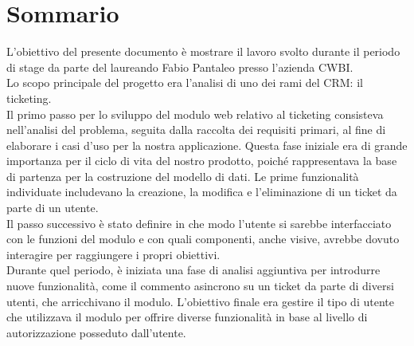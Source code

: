 \cleardoublepage
{}
{}
\begingroup
\let\clearpage\relax
\let\cleardoublepage\relax
\let\cleardoublepage\relax

\chapter*{Sommario}

L'obiettivo del presente documento è mostrare il lavoro svolto durante il periodo di stage da parte del laureando Fabio Pantaleo presso l'azienda CWBI\glsfirstoccur .\\
Lo scopo principale del progetto era l'analisi di uno dei rami del CRM\glsfirstoccur \;: il ticketing\glsfirstoccur . \\
Il primo passo per lo sviluppo del modulo web relativo al ticketing consisteva nell'analisi del problema, seguita dalla raccolta dei requisiti primari, al fine di elaborare i casi d'uso per la nostra applicazione. Questa fase iniziale era di grande importanza per il ciclo di vita del nostro prodotto, poiché rappresentava la base di partenza per la costruzione del modello di dati.
Le prime funzionalità individuate includevano la creazione, la modifica e l'eliminazione di un ticket da parte di un utente.\\
Il passo successivo è stato definire in che modo l'utente si sarebbe interfacciato con le funzioni del modulo e con quali componenti, anche visive, avrebbe dovuto interagire per raggiungere i propri obiettivi.\\
Durante quel periodo, è iniziata una fase di analisi aggiuntiva per introdurre nuove funzionalità, come il commento asincrono su un ticket da parte di diversi utenti, che arricchivano il modulo.
L'obiettivo finale era gestire il tipo di utente che utilizzava il modulo per offrire diverse funzionalità in base al livello di autorizzazione posseduto dall'utente.\\





\endgroup

\vfill
